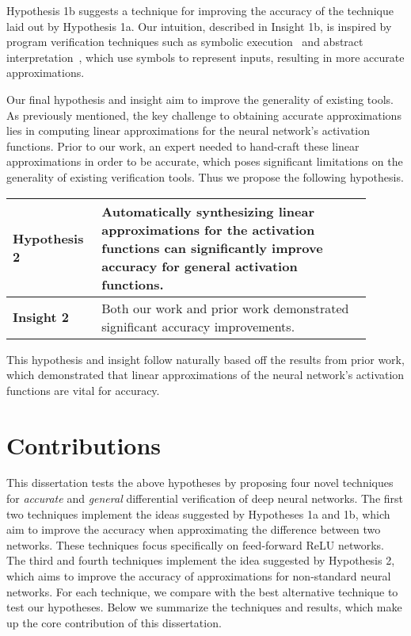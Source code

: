 Hypothesis 1b suggests a technique for improving the accuracy of the technique
laid out by Hypothesis 1a. Our intuition, described in Insight 1b, is inspired by
program verification techniques such as symbolic
execution~\cite{king1976symbolic} and abstract interpretation~\cite{CousotC77},
which use symbols to represent inputs, resulting in more accurate approximations.

Our final hypothesis and insight aim to improve the generality of existing tools.
As previously mentioned, the key challenge to obtaining accurate approximations
lies in computing linear approximations for the neural network's activation
functions. Prior to our work, an expert needed to hand-craft these linear
approximations in order to be accurate, which poses significant limitations on
the generality of existing verification tools. Thus we propose the following hypothesis.

\begin{table}[h]
	\centering
	\large
	\begin{tabular}{|p{0.2\linewidth}|p{0.7\linewidth}|} \hline
		\textbf{Hypothesis 2}      &
		Automatically synthesizing linear approximations for the activation
		functions can significantly improve accuracy for general activation
		functions. \\ \hline
		\textbf{Insight 2}        &
		Both our work and prior work demonstrated significant accuracy
		improvements. \\ \hline
	\end{tabular}
\end{table}

This hypothesis and insight follow naturally based off the results from prior
work, which demonstrated that linear approximations of the neural network's
activation functions are vital for accuracy.

\section{Contributions}
This dissertation tests the above hypotheses by proposing four novel techniques
for \textit{accurate} and \textit{general} differential verification of deep
neural networks. The first two techniques implement the ideas suggested by
Hypotheses 1a and 1b, which aim to improve the accuracy when approximating the
difference between two networks. These techniques focus specifically on
feed-forward ReLU networks. The third and fourth techniques implement the idea
suggested by Hypothesis 2, which aims to improve the accuracy of approximations
for non-standard neural networks. For each technique, we compare with the best
alternative technique to test our hypotheses. Below we summarize the techniques
and results, which make up the core contribution of this dissertation.

